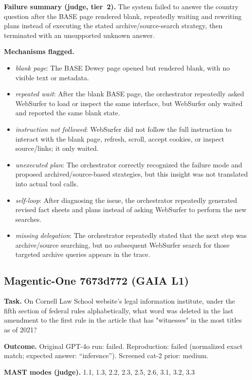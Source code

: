 \textbf{Failure summary (judge, tier~2).} The system failed to answer the country question after the BASE page rendered blank, repeatedly waiting and rewriting plans instead of executing the stated archive/source-search strategy, then terminated with an unsupported unknown answer.

\textbf{Mechanisms flagged.}
\begin{itemize}
  \item \emph{blank page}: The BASE Dewey page opened but rendered blank, with no visible text or metadata.
  \item \emph{repeated wait}: After the blank BASE page, the orchestrator repeatedly asked WebSurfer to load or inspect the same interface, but WebSurfer only waited and reported the same blank state.
  \item \emph{instruction not followed}: WebSurfer did not follow the full instruction to interact with the blank page, refresh, scroll, accept cookies, or inspect source/links; it only waited.
  \item \emph{unexecuted plan}: The orchestrator correctly recognized the failure mode and proposed archived/source-based strategies, but this insight was not translated into actual tool calls.
  \item \emph{self-loop}: After diagnosing the issue, the orchestrator repeatedly generated revised fact sheets and plans instead of asking WebSurfer to perform the new searches.
  \item \emph{missing delegation}: The orchestrator repeatedly stated that the next step was archive/source searching, but no subsequent WebSurfer search for those targeted archive queries appears in the trace.
\end{itemize}

\subsection*{Magentic-One 7673d772 (GAIA L1)}
\textbf{Task.} On Cornell Law School website's legal information institute, under the fifth section of federal rules alphabetically, what word was deleted in the last amendment to the first rule in the article that has "witnesses" in the most titles as of 2021?

\textbf{Outcome.} Original GPT-4o run: failed. Reproduction: failed (normalized exact match; expected answer: ``inference''). Screened cat-2 prior: medium.

\textbf{MAST modes (judge).} 1.1, 1.3, 2.2, 2.3, 2.5, 2.6, 3.1, 3.2, 3.3

